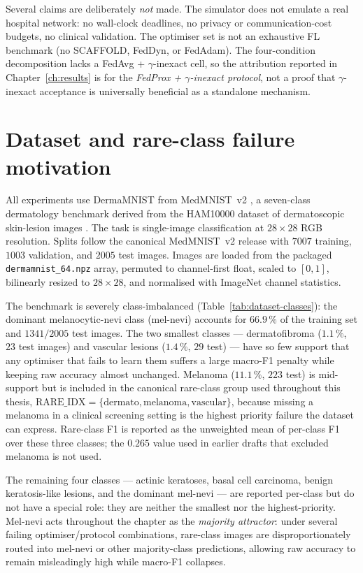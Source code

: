 \documentclass[11pt,a4paper]{report}
\begin{document}
Several claims are deliberately \emph{not} made. The simulator does
not emulate a real hospital network: no wall-clock deadlines, no
privacy or communication-cost budgets, no clinical validation. The
optimiser set is not an exhaustive FL benchmark (no SCAFFOLD, FedDyn,
or FedAdam). The four-condition decomposition lacks a FedAvg +
$\gamma$-inexact cell, so the attribution reported in
Chapter~\ref{ch:results} is for the \emph{FedProx + $\gamma$-inexact
protocol}, not a proof that $\gamma$-inexact acceptance is universally
beneficial as a standalone mechanism.

\section{Dataset and rare-class failure motivation}
\label{sec:method-dataset}

All experiments use DermaMNIST from MedMNIST~v2
\citep{yang2023medmnistv2}, a seven-class dermatology benchmark derived
from the HAM10000 dataset of dermatoscopic skin-lesion images
\citep{tschandl2018ham10000}. The task is single-image classification at
$28 \times 28$ RGB resolution. Splits follow the canonical MedMNIST~v2
release with $7007$ training, $1003$ validation, and $2005$ test images.
Images are loaded from the packaged \texttt{dermamnist\_64.npz} array,
permuted to channel-first float, scaled to $[0, 1]$, bilinearly resized to
$28 \times 28$, and normalised with ImageNet channel statistics.

The benchmark is severely class-imbalanced (Table~\ref{tab:dataset-classes}):
the dominant melanocytic-nevi class (mel-nevi) accounts for
$66.9\,\%$ of the training set and $1341 / 2005$ test images. The two
smallest classes --- dermatofibroma ($1.1\,\%$, $23$ test images) and
vascular lesions ($1.4\,\%$, $29$ test) --- have so few support that any
optimiser that fails to learn them suffers a large macro-F1 penalty
while keeping raw accuracy almost unchanged. Melanoma ($11.1\,\%$,
$223$ test) is mid-support but is included in the canonical rare-class
group used throughout this thesis,
$\mathrm{RARE\_IDX} = \{\text{dermato}, \text{melanoma}, \text{vascular}\}$,
because missing a melanoma in a clinical screening setting is the highest
priority failure the dataset can express. Rare-class F1 is reported as
the unweighted mean of per-class F1 over these three classes; the
$0.265$ value used in earlier drafts that excluded melanoma is not used.

The remaining four classes --- actinic keratoses, basal cell carcinoma,
benign keratosis-like lesions, and the dominant mel-nevi --- are reported
per-class but do not have a special role: they are neither the smallest
nor the highest-priority. Mel-nevi acts throughout the chapter as the
\emph{majority attractor}: under several failing optimiser/protocol
combinations, rare-class images are disproportionately routed into
mel-nevi or other majority-class predictions, allowing raw accuracy
to remain misleadingly high while macro-F1 collapses.
\end{document}
